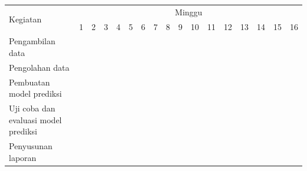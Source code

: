 \newcommand{\w}{}
\newcommand{\G}{\cellcolor{gray}}
\begin{table}[h!]
  \label{tbl:timeline}
  \begin{tabular}{|p{3.5cm}|c|c|c|c|c|c|c|c|c|c|c|c|c|c|c|c|}

    \hline
    \multirow{2}{*}{Kegiatan} & \multicolumn{16}{|c|}{Minggu} \\
    \cline{2-17} &
    1 & 2 & 3 & 4 & 5 & 6 & 7 & 8 & 9 & 10 & 11 & 12 & 13 & 14 & 15 & 16 \\
    \hline

    Pengambilan data &
    \G & \G & \G & \w & \w & \w & \w & \w & \w & \w & \w & \w & \w & \w & \w & \w \\
    \hline

    Pengolahan data &
    \w & \w & \w & \G & \G & \G & \w & \w & \w & \w & \w & \w & \w & \w & \w & \w \\
    \hline

    Pembuatan model prediksi &
    \w & \w & \w & \w & \w & \w & \G & \G & \G & \G & \G & \G & \w & \w & \w & \w \\
    \hline

    Uji coba dan evaluasi model prediksi &
    \w & \w & \w & \w & \w & \w & \w & \w & \w & \G & \G & \G & \G & \G & \G & \G \\
    \hline

    Penyusunan laporan &
    \G & \G & \G & \G & \G & \G & \G & \G & \G & \G & \G & \G & \G & \G & \G & \G \\
    \hline

  \end{tabular}
\end{table}


